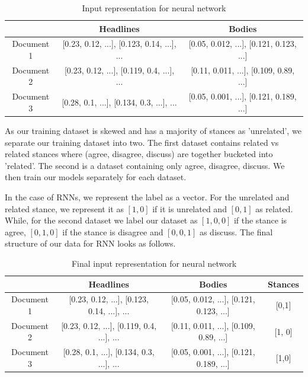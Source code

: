 \documentclass[11.5pt]{article}
\begin{document}
\begin{table}[h]
  \centering
  \begin{tabular} 
    {|c|c|c|}
    \hline
    & Headlines & Bodies \\
    \hline
    Document 1 & [0.23, 0.12, ...], [0.123, 0.14, ...], ... & [0.05, 0.012, ...], [0.121, 0.123, ...] \\
    \hline
    Document 2 & [0.23, 0.12, ...], [0.119, 0.4, ...], ... & [0.11, 0.011, ...], [0.109, 0.89, ...] \\
    \hline
    Document 3 & [0.28, 0.1, ...], [0.134, 0.3, ...], ... & [0.05, 0.001, ...], [0.121, 0.189, ...] \\
    \hline
  \end{tabular}
  \caption{Input representation for neural network}
\end{table}

As our training dataset is skewed and has a majority of stances as 'unrelated', we separate our training dataset into two. The first dataset contains related vs related stances where (agree, disagree, discuss) are together bucketed into 'related'. The second is a dataset containing only agree, disagree, discuss. We then train our models separately for each dataset.

In the case of RNNs, we represent the label as a vector. For the unrelated and related stance, we represent it as $[1, 0]$ if it is unrelated and $[0, 1]$ as related.
While, for the second dataset we label our dataset as $[1, 0, 0]$ if the stance is agree, $[0, 1, 0]$ if the stance is disagree and $[0, 0, 1]$ as discuss. The final structure of our data for RNN looks as follows.

\begin{table}[h]
  \centering
  \begin{tabular} 
    {|c|c|c|c|}
    \hline
    & Headlines & Bodies & Stances \\
    \hline
    Document 1 & [0.23, 0.12, ...], [0.123, 0.14, ...], ... & [0.05, 0.012, ...], [0.121, 0.123, ...] & [0,1] \\
    \hline
    Document 2 & [0.23, 0.12, ...], [0.119, 0.4, ...], ... & [0.11, 0.011, ...], [0.109, 0.89, ...] & [1, 0] \\
    \hline
    Document 3 & [0.28, 0.1, ...], [0.134, 0.3, ...], ... & [0.05, 0.001, ...], [0.121, 0.189, ...] & [1,0] \\
    \hline
  \end{tabular}
  \caption{Final input representation for neural network}
\end{table}
\end{document}

